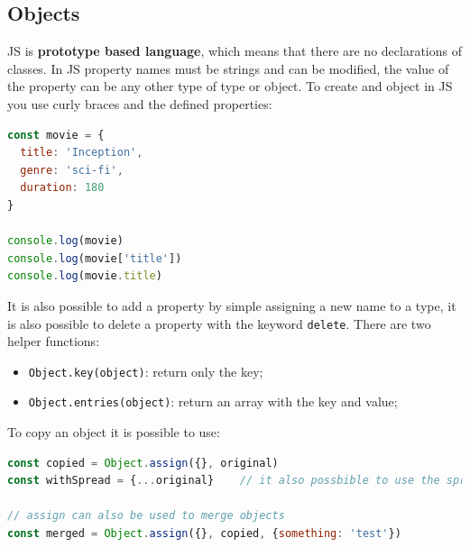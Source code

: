 \documentclass[12pt]{article}
\begin{document}
\subsection{Objects}
JS is \textbf{prototype based language}, which means that there are no declarations of classes. In JS property names must be strings and can be modified, the value of the property can be any other type of type or object. To create and object in JS you use curly braces and the defined properties:
\begin{lstlisting}[language=js]
const movie = {
  title: 'Inception',
  genre: 'sci-fi',
  duration: 180
}

console.log(movie)
console.log(movie['title'])
console.log(movie.title)
\end{lstlisting}
It is also possible to add a property by simple assigning a new name to a type, it is also possible to delete a property with the keyword \texttt{delete}. There are two helper functions:
\begin{itemize}
  \item \texttt{Object.key(object)}: return only the key;
  \item \texttt{Object.entries(object)}: return an array with the key and value;
\end{itemize}
To copy an object it is possible to use:
\begin{lstlisting}[language=js]
const copied = Object.assign({}, original)
const withSpread = {...original}    // it also possbible to use the spread operator

// assign can also be used to merge objects
const merged = Object.assign({}, copied, {something: 'test'})
\end{lstlisting}
\end{document}
